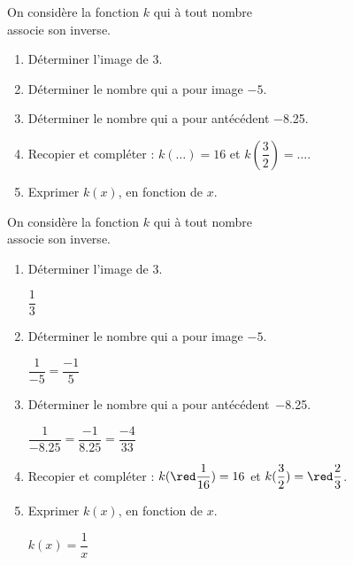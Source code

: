 \begin{exercice}
    On considère la fonction $k$ qui à tout nombre \\associe son inverse.
    \begin{enumerate}
        \item Déterminer l'image de $3$.
        \item Déterminer le nombre qui a pour image $-5$.
        \item Déterminer le nombre qui a pour antécédent \num{-8.25}.
        \item Recopier et compléter : $k(\dots{})=16$ et $k(\dfrac{3}{2})=\dots{}$.
        \item Exprimer $k(x)$, en fonction de $x$.
    \end{enumerate}
\end{exercice}
\begin{corrige}
    On considère la fonction $k$ qui à tout nombre \\associe son inverse.

    \begin{enumerate}
        \item Déterminer l'image de $3$.
        
        \smallskip
        {\red $\dfrac{1}{3}$}
        \smallskip
        \item Déterminer le nombre qui a pour image $-5$.
        
        \smallskip
        {\red $\dfrac{1}{-5}=\dfrac{-1}{5}$}
        \smallskip
        \item Déterminer le nombre qui a pour \hbox{antécédent \num{-8.25}.}
        
        {\red $\dfrac{1}{\num{-8.25}}=\dfrac{-1}{\num{8.25}}=\dfrac{-4}{33}$}
        \item Recopier et compléter : $k({\red \dfrac{1}{16}})=16$ et $k(\dfrac{3}{2})={\red \dfrac{2}{3}}$.
        \item Exprimer $k(x)$, en fonction de $x$.
        
        {\red $k(x)=\dfrac{1}{x}$}
    \end{enumerate}
\end{corrige}
